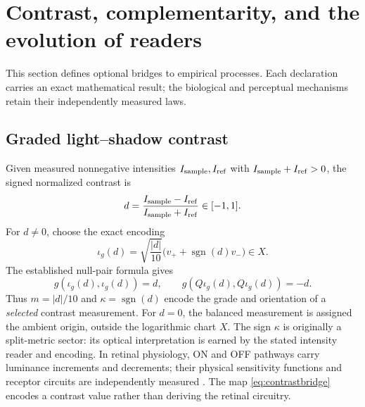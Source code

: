 \documentclass[10pt,letterpaper]{article}
\theoremstyle{definition}\newtheorem{definition}[theorem]{Definition}
\newcommand{\sgn}{\operatorname{sgn}}
\begin{document}
\section{Contrast, complementarity, and the evolution of readers}\label{sec:interfaces}
This section defines optional bridges to empirical processes. Each declaration carries an exact mathematical result; the biological and perceptual mechanisms retain their independently measured laws.

\subsection*{Graded light--shadow contrast}
Given measured nonnegative intensities $I_{\rm sample},I_{\rm ref}$ with $I_{\rm sample}+I_{\rm ref}>0$, the signed normalized contrast is
\begin{equation}\label{eq:contrast}
 d=\frac{I_{\rm sample}-I_{\rm ref}}{I_{\rm sample}+I_{\rm ref}}\in[-1,1].
\end{equation}
For $d\ne0$, choose the exact encoding
\begin{equation}\label{eq:contrastbridge}
 \iota_g(d)=\sqrt{\frac{|d|}{10}}\bigl(v_++\sgn(d)v_-\bigr)\in X.
\end{equation}
The established null-pair formula gives
\begin{equation}\label{eq:contrastproof}
 \boxed{g(\iota_g(d),\iota_g(d))=d,\qquad
 g(Q\iota_g(d),Q\iota_g(d))=-d.}
\end{equation}
Thus $m=|d|/10$ and $\kappa=\sgn(d)$ encode the grade and orientation of a \emph{selected} contrast measurement. For $d=0$, the balanced measurement is assigned the ambient origin, outside the logarithmic chart $X$. The sign $\kappa$ is originally a split-metric sector: its optical interpretation is earned by the stated intensity reader and encoding. In retinal physiology, ON and OFF pathways carry luminance increments and decrements; their physical sensitivity functions and receptor circuits are independently measured \cite{retina}. The map \eqref{eq:contrastbridge} encodes a contrast value rather than deriving the retinal circuitry.
\end{document}
